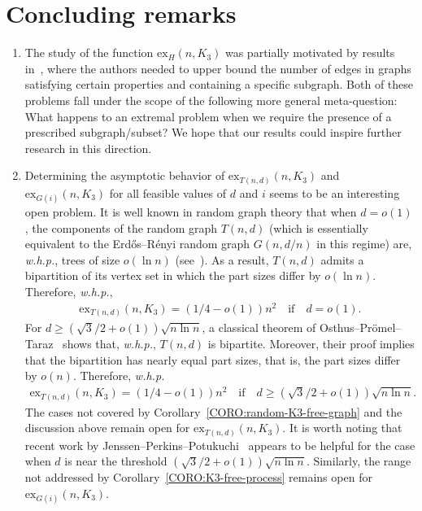 \documentclass[11pt,a4paper]{article}
\newcommand{\graph}{H}
\begin{document}
\section{Concluding remarks}\label{SEC:Remark}
\begin{enumerate}
    \item The study of the function $\mathrm{ex}_{\graph}(n,K_{3})$ was partially motivated by results in~\cite[Section~5]{CLSW25}, where the authors needed to upper bound the number of edges in graphs satisfying certain properties and containing a specific subgraph. Both of these problems fall under the scope of the following more general meta-question:
What happens to an extremal problem when we require the presence of a prescribed subgraph/subset?
We hope that our results could inspire further research in this direction. 
\item Determining the asymptotic behavior of $\mathrm{ex}_{T(n,d)}(n, K_{3})$ and $\mathrm{ex}_{G(i)}(n, K_{3})$ for all feasible values of $d$ and $i$ seems to be an interesting open problem. 
It is well known in random graph theory that when $d = o(1)$, the components of the random graph $T(n,d)$ (which is essentially equivalent to the  Erd\H{o}s--R\'{e}nyi random graph $G(n,d/n)$ in this regime) are, \textit{w.h.p.}, trees of size $o(\ln  n)$ (see~{\cite[Theorems~2.1~and~2.9]{FK16book}}).
As a result, $T(n,d)$ admits a bipartition of its vertex set in which the part sizes differ by $o(\ln  n)$. Therefore, \textit{w.h.p.}, 
\begin{align*}
    \mathrm{ex}_{T(n,d)}(n,K_{3}) = (1/4 - o(1))n^2
    \quad\text{if}\quad d = o(1).
\end{align*}
%
For $d \ge \left( \sqrt{3}/2 + o(1) \right) \sqrt{n \ln n}$, a classical theorem of Osthus--Pr{\"o}mel--Taraz~\cite{OPT03} shows that, \textit{w.h.p.}, $T(n,d)$ is bipartite. Moreover, their proof implies that the bipartition has nearly equal part sizes, that is, the part sizes differ by $o(n)$.
Therefore, \textit{w.h.p.}~
\begin{align*}
    \mathrm{ex}_{T(n,d)}(n,K_{3}) = (1/4 - o(1))n^2
    \quad\text{if}\quad d \ge \left( \sqrt{3}/2 + o(1) \right) \sqrt{n \ln n}.
\end{align*}
%
The cases not covered by Corollary~\ref{CORO:random-K3-free-graph} and the discussion above remain open for $\mathrm{ex}_{T(n,d)}(n, K_{3})$.  
It is worth noting that recent work by Jenssen--Perkins--Potukuchi~\cite{JPP23} appears to be helpful for the case when $d$ is near the threshold $\left( \sqrt{3}/2 + o(1) \right) \sqrt{n \ln n}$. 
Similarly, the range not addressed by Corollary~\ref{CORO:K3-free-process} remains open for $\mathrm{ex}_{G(i)}(n, K_{3})$. 



\end{enumerate}
\end{document}
